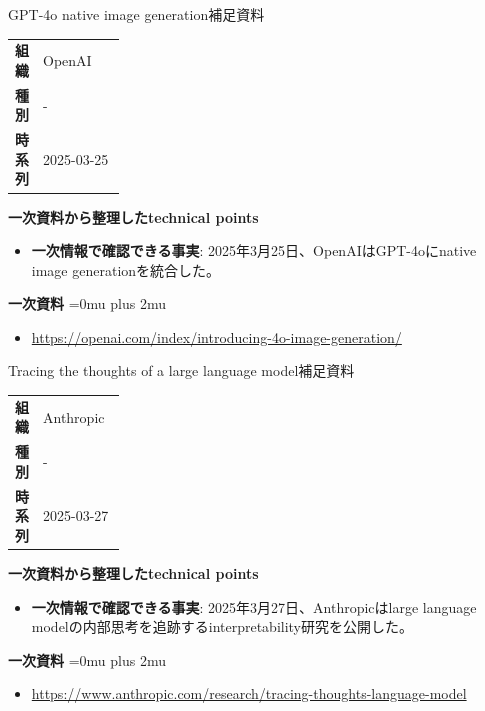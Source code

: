 \begin{technicalnote}{GPT-4o native image generation}{補足資料}
\begingroup
\begin{tabularx}{\linewidth}{@{}>{\bfseries}p{0.22\linewidth}X@{}}
組織 & OpenAI \\
種別 & - \\
時系列 & 2025-03-25 \\
\end{tabularx}
\smallskip
{\bfseries 一次資料から整理したtechnical points}
\begin{itemize}[leftmargin=1.5em,itemsep=0.35em]
\item \textbf{一次情報で確認できる事実}: 2025年3月25日、OpenAIはGPT-4oにnative image generationを統合した。
\end{itemize}
\begin{samepage}
{\bfseries 一次資料}
\begingroup\sloppy
\Urlmuskip=0mu plus 2mu\relax
\begin{itemize}[leftmargin=1.5em,itemsep=0.25em]
\item {\scriptsize\url{https://openai.com/index/introducing-4o-image-generation/}}
\end{itemize}
\endgroup
\end{samepage}
\endgroup
\end{technicalnote}
\medskip

\begin{technicalnote}{Tracing the thoughts of a large language model}{補足資料}
\begingroup
\begin{tabularx}{\linewidth}{@{}>{\bfseries}p{0.22\linewidth}X@{}}
組織 & Anthropic \\
種別 & - \\
時系列 & 2025-03-27 \\
\end{tabularx}
\smallskip
{\bfseries 一次資料から整理したtechnical points}
\begin{itemize}[leftmargin=1.5em,itemsep=0.35em]
\item \textbf{一次情報で確認できる事実}: 2025年3月27日、Anthropicはlarge language modelの内部思考を追跡するinterpretability研究を公開した。
\end{itemize}
\begin{samepage}
{\bfseries 一次資料}
\begingroup\sloppy
\Urlmuskip=0mu plus 2mu\relax
\begin{itemize}[leftmargin=1.5em,itemsep=0.25em]
\item {\scriptsize\url{https://www.anthropic.com/research/tracing-thoughts-language-model}}
\end{itemize}
\endgroup
\end{samepage}
\endgroup
\end{technicalnote}
\medskip

